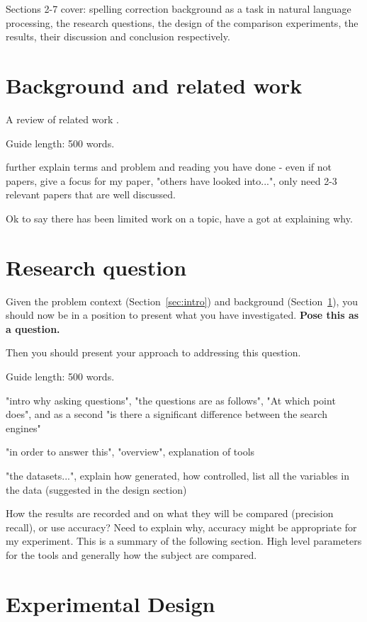 \documentclass{csfourzero}
\begin{document}
Sections 2-7 cover: spelling correction background as a task in natural language processing, the research questions, the design of the comparison experiments, the results, their discussion and conclusion respectively.

\section{Background and related work}
\label{sec:lit}

A review of related work \cite{p2pbookv2,Burnett,p2pwiki}.

Guide length: 500 words.

further explain terms and problem and reading you have done - even if not papers, give a focus for my paper, "others have looked into...", only need 2-3 relevant papers that are well discussed.

Ok to say there has been limited work on a topic, have a got at explaining why.

\section{Research question}
\label{sec:rq}

Given the problem context (Section~\ref{sec:intro}) and background
(Section~\ref{sec:lit}), you should now be in a position to present
what you have investigated. \textbf{Pose this as a question.}

Then you should present your approach to addressing this
question.

Guide length: 500 words.

"intro why asking questions", "the questions are as follows", "At which point does", and as a second "is there a significant difference between the search engines"

"in order to answer this", "overview", explanation of tools

"the datasets...", explain how generated, how controlled, list all the variables in the data (suggested in the design section)

How the results are recorded and on what they will be compared (precision recall), or use accuracy? Need to explain why, accuracy might be appropriate for my experiment. This is a summary of the following section. High level parameters for the tools and generally how the subject are compared.

\section{Experimental Design}
\label{sec:exp}
\end{document}
